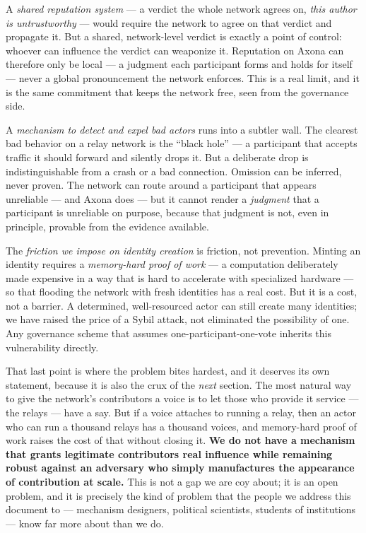 \documentclass[nobib,justified]{tufte-handout}
\begin{document}
A \emph{shared reputation system} --- a verdict the whole network agrees on,
\emph{this author is untrustworthy} --- would require the network to agree on that
verdict and propagate it. But a shared, network-level verdict is exactly a point
of control: whoever can influence the verdict can weaponize it. Reputation on
Axona can therefore only be local --- a judgment each participant forms and holds
for itself --- never a global pronouncement the network enforces. This is a real
limit, and it is the same commitment that keeps the network free, seen from the
governance side.

A \emph{mechanism to detect and expel bad actors} runs into a subtler wall. The
clearest bad behavior on a relay network is the ``black hole'' --- a participant
that accepts traffic it should forward and silently drops it. But a deliberate
drop is indistinguishable from a crash or a bad connection. Omission can be
inferred, never proven. The network can route around a participant that appears
unreliable --- and Axona does --- but it cannot render a \emph{judgment} that a
participant is unreliable on purpose, because that judgment is not, even in
principle, provable from the evidence available.

The \emph{friction we impose on identity creation} is friction, not prevention.
Minting an identity requires a \emph{memory-hard proof of work} --- a computation
deliberately made expensive in a way that is hard to accelerate with specialized
hardware --- so that flooding the network with fresh identities has a real cost.
But it is a cost, not a barrier. A determined, well-resourced actor can still
create many identities; we have raised the price of a Sybil attack, not
eliminated the possibility of one. Any governance scheme that assumes
one-participant-one-vote inherits this vulnerability directly.

That last point is where the problem bites hardest, and it deserves its own
statement, because it is also the crux of the \emph{next} section. The most
natural way to give the network's contributors a voice is to let those who provide
it service --- the relays --- have a say. But if a voice attaches to running a
relay, then an actor who can run a thousand relays has a thousand voices, and
memory-hard proof of work raises the cost of that without closing it.
\textbf{We do not have a mechanism that grants legitimate contributors real
influence while remaining robust against an adversary who simply manufactures the
appearance of contribution at scale.} This is not a gap we are coy about; it is an
open problem, and it is precisely the kind of problem that the people we address
this document to --- mechanism designers, political scientists, students of
institutions --- know far more about than we do.
\end{document}
